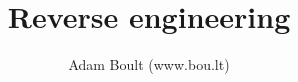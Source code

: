 \documentclass[oneside]{book}
\begin{document}
\author{Adam Boult (www.bou.lt)}
\title{Reverse engineering}
\maketitle

\setcounter{tocdepth}{0}
\tableofcontents


\end{document}
